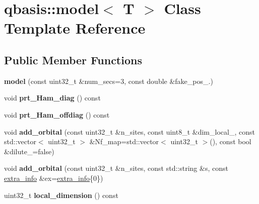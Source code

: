 \hypertarget{classqbasis_1_1model}{}\section{qbasis\+:\+:model$<$ T $>$ Class Template Reference}
\label{classqbasis_1_1model}
\subsection*{Public Member Functions}
\begin{DoxyCompactItemize}
\item 
\mbox{\label{classqbasis_1_1model_a66593ac4877164a6c30bb0fce95c4205}} 
{\bfseries model} (const uint32\+\_\+t \&num\+\_\+secs=3, const double \&fake\+\_\+pos\+\_.)
\item 
\mbox{\label{classqbasis_1_1model_ad41cb5feef8eec4166a9dab62aca5915}} 
void {\bfseries prt\+\_\+\+Ham\+\_\+diag} () const
\item 
\mbox{\label{classqbasis_1_1model_a7c8da084d8ea74f44bf42ad3287883df}} 
void {\bfseries prt\+\_\+\+Ham\+\_\+offdiag} () const
\item 
\mbox{\label{classqbasis_1_1model_a736f82f50927d6bff6b0d63d31639876}} 
void {\bfseries add\+\_\+orbital} (const uint32\+\_\+t \&n\+\_\+sites, const uint8\+\_\+t \&dim\+\_\+local\+\_\+, const std\+::vector$<$ uint32\+\_\+t $>$ \&Nf\+\_\+map=std\+::vector$<$ uint32\+\_\+t $>$(), const bool \&dilute\+\_\+=false)
\item 
\mbox{\label{classqbasis_1_1model_af18adfe1b7065cf2b8eea18c1fa91621}} 
void {\bfseries add\+\_\+orbital} (const uint32\+\_\+t \&n\+\_\+sites, const std\+::string \&s, const \hyperlink{structqbasis_1_1extra__info}{extra\+\_\+info} \&ex=\hyperlink{structqbasis_1_1extra__info}{extra\+\_\+info}\{0\})
\item 
\mbox{\label{classqbasis_1_1model_a610bcbc98efcbb6a6639a3797316742d}} 
uint32\+\_\+t {\bfseries local\+\_\+dimension} () const
\item 
\mbox{\label{classqbasis_1_1model_aaf8ba4987f3a0c327237bf6f186208c7}} 

\end{DoxyCompactItemize}
